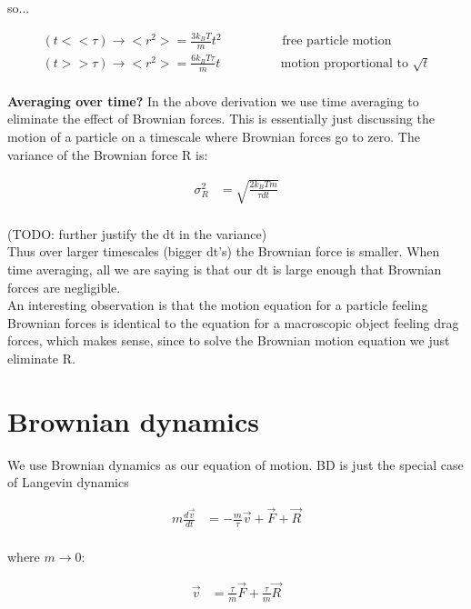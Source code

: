 \documentclass[10pt]{article} %
\begin{document}
so...

\begin{align*}
  \left(t << \tau \right) \rightarrow <r^2> = \frac{3k_BT}{m}t^2 \hspace{2cm}\mbox{free particle motion}\\
  \left(t >> \tau \right) \rightarrow <r^2> = \frac{6k_BT\tau}{m}t \hspace{2cm}\mbox{motion proportional to }\sqrt{t}\\
\end{align*}

\textbf{Averaging over time?}
In the above derivation we use time averaging to eliminate the effect of Brownian forces. This is
essentially just discussing the motion of a particle on a timescale where Brownian forces go to
zero. The variance of the Brownian force R is:

\begin{align*}
  \sigma_R^2 &= \sqrt{\frac{2k_BTm}{\tau dt}}\\
\end{align*}

(TODO: further justify the dt in the variance)\\
Thus over larger timescales (bigger dt's) the Brownian force is smaller. When time averaging, all
we are saying is that our dt is large enough that Brownian forces are negligible.\\

An interesting observation is that the motion equation for a particle feeling Brownian forces is
identical to the equation for a macroscopic object feeling drag forces, which makes sense, since
to solve the Brownian motion equation we just eliminate R.\\

\section{Brownian dynamics}
We use Brownian dynamics as our equation of motion. BD is just the special case of Langevin dynamics

\begin{align*}
  m\frac{d\vec{v}}{dt} &= -\frac{m}{\tau}\vec{v} + \vec{F} + \vec{R}\\
\end{align*}

where $m\rightarrow0$:

\begin{align*}
  \vec{v} &= \frac{\tau}{m}\vec{F} + \frac{\tau}{m}\vec{R}\\
\end{align*}
\end{document}
